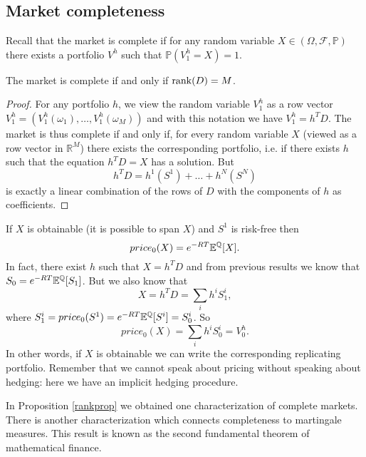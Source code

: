 \subsection{Market completeness}
Recall that the market is complete if for any random variable $X\in(\Omega,\mathcal{F},\mathbb{P})$ there exists a portfolio $V^h$ such that $\mathbb{P}(V_1^h=X)=1$. 
\begin{proposition}\label{rankprop}
    The market is complete if and only if $\rank(D)=M$.
\end{proposition}
\begin{proof}
    For any portfolio $h$, we view the random variable $V^h_1$ as a row vector $V^h_1 =(V^h_1(\omega_1),\dots,V^h_1(\omega_M))$ and with this notation we have $V^h_1 = h^TD$. The market is thus complete if and only if, for every random variable $X$ (viewed as a row vector in $\mathbb{R}^M$) there exists the corresponding portfolio, i.e. if there exists $h$ such that the equation $h^TD = X$ has a solution. But 
    \begin{equation*}
        h^TD = h^1(S^1)+\dots+h^N(S^N)
    \end{equation*}
    is exactly a linear combination of the rows of $D$ with the components of $h$ as coefficients.
\end{proof}
\begin{remark}
    If $X$ is obtainable (it is possible to span $X$) and $S^1$ is risk-free then 
    \begin{equation*}
        price_0(X) = e^{-RT}\mathbb{E}^{\mathbb{Q}}[X].
    \end{equation*}
    In fact, there exist $h$ such that $X=h^TD$ and from previous results we know that $S_0 = e^{-RT}\mathbb{E}^{\mathbb{Q}}[S_1]$. But we also know that 
    \begin{equation*}
        X=h^TD=\sum_ih^iS_1^i,
    \end{equation*}
    where $S_1^i=price_0(S^1)=e^{-RT}\mathbb{E}^{\mathbb{Q}}[S^i]=S^i_0$. So
    \begin{equation*}
        price_0(X) = \sum_ih^iS_0^i = V_0^h.
    \end{equation*}
    In other words, if $X$ is obtainable we can write the corresponding replicating portfolio. Remember that we cannot speak about pricing without speaking about hedging: here we have an implicit hedging procedure.
\end{remark}
In Proposition \ref{rankprop} we obtained one characterization of complete markets. There is another characterization which connects completeness to martingale measures. This result is known as the second fundamental theorem of mathematical finance. 
